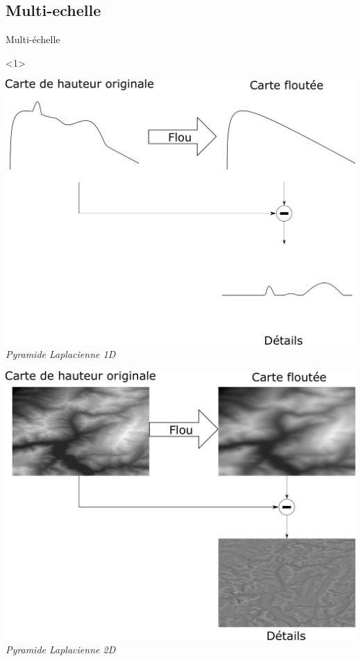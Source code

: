 \documentclass{beamer}
\begin{document}
\subsection*{Multi-echelle}
\begin{frame}{Multi-échelle }
\begin{onlyenv}<1>
\begin{center}
    \begin{minipage}[c]{0.45\linewidth}
    \begin{center}
    	\includegraphics[width=1.0\linewidth]{Schema/pyramide_Laplace_schema.pdf}\\
 		\textit{Pyramide Laplacienne 1D}
    \end{center}
    \end{minipage}
    \hspace{0.2cm}
    \begin{minipage}[c]{0.45\linewidth}
    \begin{center}
    	\includegraphics[width=1.0\linewidth]{Schema/pyramide_Laplace_image.pdf}\\
 		\textit{Pyramide Laplacienne 2D}
    \end{center}
    \end{minipage}


\end{center}
\end{onlyenv}
\end{frame}
\end{document}
